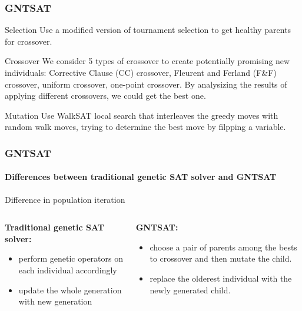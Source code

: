 \begin{frame}
	\frametitle{GNTSAT}
	\begin{block}{Selection}
		Use a modified version of tournament selection to get healthy parents for crossover.
	\end{block}
	\begin{block}{Crossover}
	We consider 5 types of crossover to create potentially promising new individuals: Corrective Clause (CC) crossover,
	Fleurent and Ferland (F\&F) crossover, uniform crossover, one-point crossover. By analysizing the results of applying different crossovers, we could get the best one.
	\end{block}
	\begin{block}{Mutation}
		Use WalkSAT local search that interleaves the greedy moves with random walk moves, trying to determine the best move by filpping a variable.
	\end{block}
\end{frame}
\begin{frame}[t]
	\frametitle{GNTSAT}
	\framesubtitle{Differences between traditional genetic SAT solver and GNTSAT}
	\begin{block}{Difference in population iteration}
		\begin{columns}[t]
			\begin{column}{0.5\textwidth}
				\textbf{Traditional genetic SAT solver:}
				\begin{itemize}
				\item perform genetic operators on each individual accordingly
				\item update the whole generation with new generation
				\end{itemize}
			\end{column}
			\begin{column}{0.5\textwidth}
				\textbf{GNTSAT:}
				\begin{itemize}
				\item choose a pair of parents among the bests to crossover and then mutate the child. 
				\item replace the olderest individual with the newly generated child.
				\end{itemize}
				\end{column}
			\end{columns}
	\end{block}
\end{frame}

